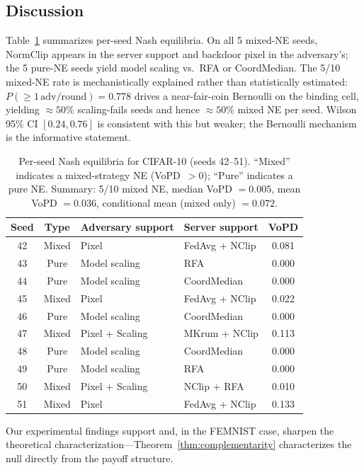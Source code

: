 \documentclass{article}
\begin{document}
\subsection{Discussion}
\label{sec:multi_dataset}

Table~\ref{tab:perseed_equil} summarizes per-seed Nash equilibria. On all 5 mixed-NE seeds, NormClip appears in the server support and backdoor pixel in the adversary's; the 5 pure-NE seeds yield model scaling vs.\ RFA or CoordMedian. The 5/10 mixed-NE rate is mechanistically explained rather than statistically estimated: $P(\geq\!1\,\text{adv/round}) = 0.778$ drives a near-fair-coin Bernoulli on the binding cell, yielding ${\approx}50\%$ scaling-fails seeds and hence ${\approx}50\%$ mixed NE per seed. Wilson 95\% CI $[0.24, 0.76]$ is consistent with this but weaker; the Bernoulli mechanism is the informative statement.

\begin{table}[t]
\caption{Per-seed Nash equilibria for CIFAR-10 (seeds 42--51). ``Mixed'' indicates a mixed-strategy NE (VoPD~$> 0$); ``Pure'' indicates a pure NE. Summary: 5/10 mixed NE, median VoPD $= 0.005$, mean VoPD $= 0.036$, conditional mean (mixed only) $= 0.072$.}
\label{tab:perseed_equil}
\centering
\small
\begin{tabular}{c|c|l|l|c}
\toprule
\textbf{Seed} & \textbf{Type} & \textbf{Adversary support} & \textbf{Server support} & \textbf{VoPD} \\
\midrule
42 & Mixed & Pixel & FedAvg + NClip & 0.081 \\
43 & Pure  & Model scaling & RFA & 0.000 \\
44 & Pure  & Model scaling & CoordMedian & 0.000 \\
45 & Mixed & Pixel & FedAvg + NClip & 0.022 \\
46 & Pure  & Model scaling & CoordMedian & 0.000 \\
47 & Mixed & Pixel + Scaling & MKrum + NClip & 0.113 \\
48 & Pure  & Model scaling & CoordMedian & 0.000 \\
49 & Pure  & Model scaling & RFA & 0.000 \\
50 & Mixed & Pixel + Scaling & NClip + RFA & 0.010 \\
51 & Mixed & Pixel & FedAvg + NClip & 0.133 \\
\bottomrule
\end{tabular}
\end{table}

Our experimental findings support and, in the FEMNIST case, sharpen the theoretical characterization---Theorem~\ref{thm:complementarity} characterizes the null directly from the payoff structure.
\end{document}
